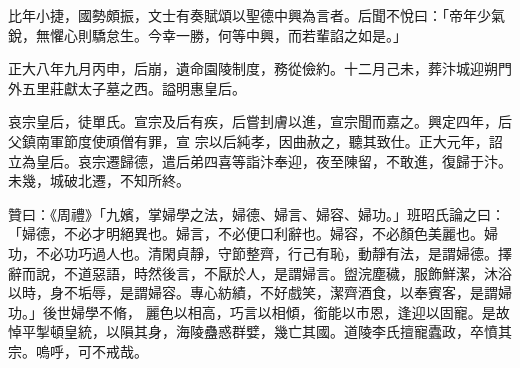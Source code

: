 \begin{pinyinscope}
 比年小捷，國勢頗振，文士有奏賦頌以聖德中興為言者。后聞不悅曰：「帝年少氣銳，無懼心則驕怠生。今幸一勝，何等中興，而若輩諂之如是。」



 正大八年九月丙申，后崩，遺命園陵制度，務從儉約。十二月己未，葬汴城迎朔門外五里莊獻太子墓之西。謚明惠皇后。



 哀宗皇后，徒單氏。宣宗及后有疾，后嘗刲膚以進，宣宗聞而嘉之。興定四年，后父鎮南軍節度使頑僧有罪，宣
 宗以后純孝，因曲赦之，聽其致仕。正大元年，詔立為皇后。哀宗遷歸德，遣后弟四喜等詣汴奉迎，夜至陳留，不敢進，復歸于汴。未幾，城破北遷，不知所終。



 贊曰：《周禮》「九嬪，掌婦學之法，婦德、婦言、婦容、婦功。」班昭氏論之曰：「婦德，不必才明絕異也。婦言，不必便口利辭也。婦容，不必顏色美麗也。婦功，不必功巧過人也。清閑貞靜，守節整齊，行己有恥，動靜有法，是謂婦德。擇辭而說，不道惡語，時然後言，不厭於人，是謂婦言。盥浣塵穢，服飾鮮潔，沐浴以時，身不垢辱，是謂婦容。專心紡績，不好戲笑，潔齊酒食，以奉賓客，是謂婦功。」後世婦學不脩，
 麗色以相高，巧言以相傾，銜能以市恩，逢迎以固寵。是故悼平掣頓皇統，以隕其身，海陵蠱惑群嬖，幾亡其國。道陵李氏擅寵蠹政，卒憤其宗。嗚呼，可不戒哉。



\end{pinyinscope}